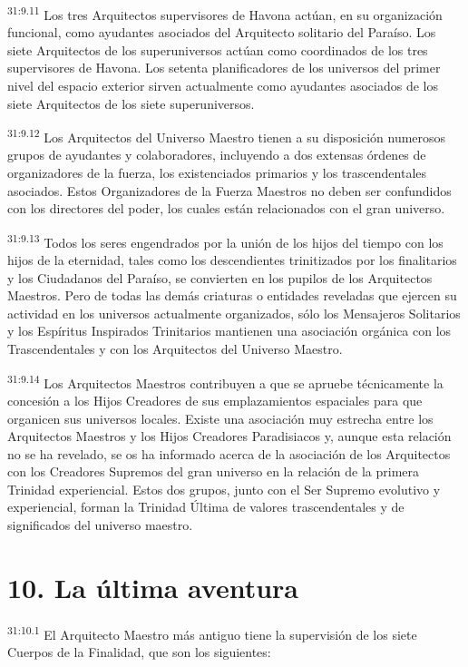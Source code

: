 \par
\textsuperscript{31:9.11} Los tres Arquitectos supervisores de Havona actúan, en su organización funcional, como ayudantes asociados del Arquitecto solitario del Paraíso. Los siete Arquitectos de los superuniversos actúan como coordinados de los tres supervisores de Havona. Los setenta planificadores de los universos del primer nivel del espacio exterior sirven actualmente como ayudantes asociados de los siete Arquitectos de los siete superuniversos.

\par
\textsuperscript{31:9.12} Los Arquitectos del Universo Maestro tienen a su disposición numerosos grupos de ayudantes y colaboradores, incluyendo a dos extensas órdenes de organizadores de la fuerza, los existenciados primarios y los trascendentales asociados. Estos Organizadores de la Fuerza Maestros no deben ser confundidos con los directores del poder, los cuales están relacionados con el gran universo.

\par
\textsuperscript{31:9.13} Todos los seres engendrados por la unión de los hijos del tiempo con los hijos de la eternidad, tales como los descendientes trinitizados por los finalitarios y los Ciudadanos del Paraíso, se convierten en los pupilos de los Arquitectos Maestros. Pero de todas las demás criaturas o entidades reveladas que ejercen su actividad en los universos actualmente organizados, sólo los Mensajeros Solitarios y los Espíritus Inspirados Trinitarios mantienen una asociación orgánica con los Trascendentales y con los Arquitectos del Universo Maestro.

\par
\textsuperscript{31:9.14} Los Arquitectos Maestros contribuyen a que se apruebe técnicamente la concesión a los Hijos Creadores de sus emplazamientos espaciales para que organicen sus universos locales. Existe una asociación muy estrecha entre los Arquitectos Maestros y los Hijos Creadores Paradisiacos y, aunque esta relación no se ha revelado, se os ha informado acerca de la asociación de los Arquitectos con los Creadores Supremos del gran universo en la relación de la primera Trinidad experiencial. Estos dos grupos, junto con el Ser Supremo evolutivo y experiencial, forman la Trinidad Última de valores trascendentales y de significados del universo maestro.

\section*{10. La última aventura}
\par
\textsuperscript{31:10.1} El Arquitecto Maestro más antiguo tiene la supervisión de los siete Cuerpos de la Finalidad, que son los siguientes:

